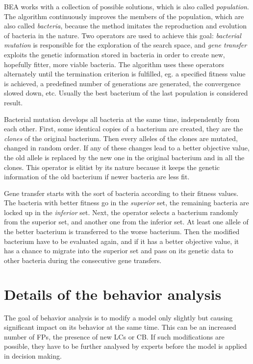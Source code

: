 \documentclass[graybox]{svmult}
\begin{document}
BEA works with a collection of possible solutions, which is also called 
\emph{population}. The algorithm continuously improves the members of 
the population, which are also called \emph{bacteria}, because the 
method imitates the reproduction and evolution of bacteria in the 
nature. Two operators are used to achieve this goal: \emph{bacterial 
mutation} is responsible for the exploration of the search space, and 
\emph{gene transfer} exploits the genetic information stored in 
bacteria in order to create new, hopefully fitter, more viable 
bacteria. The algorithm uses these operators alternately until the 
termination criterion is fulfilled, eg. a specified fitness value is 
achieved, a predefined number of generations are generated, the 
convergence slowed down, etc. Usually the best bacterium of the 
last population is considered result.

Bacterial mutation develops all bacteria at the same time, 
independently from each other. First, some identical copies of a 
bacterium are created, they are the \emph{clones} of the original 
bacterium. Then every alleles of the clones are mutated, changed in 
random order. If any of these changes lead to a better objective 
value, the old allele is replaced by the new one in the original 
bacterium and in all the clones. This operator is elitist by its 
nature because it keeps the genetic information of the old bacterium 
if newer bacteria are less fit.

Gene transfer starts with the sort of bacteria according to their 
fitness values. The bacteria with better fitness go in the 
\emph{superior} set, the remaining bacteria are locked up in the 
\emph{inferior} set. Next, the operator selects a bacterium randomly 
from the superior set, and another one from the inferior set. At least 
one allele of the better bacterium is transferred to the worse 
bacterium. Then the modified bacterium have to be evaluated again, and 
if it has a better objective value, it has a chance to migrate into 
the superior set and pass on its genetic data to other bacteria during 
the consecutive gene transfers.

\section{Details of the behavior analysis}
\label{sec:behaviorAnalysis}

The goal of behavior analysis is to modify a model only slightly but 
causing significant impact on its behavior at the same time. This 
can be an increased number of FPs, the presence of new LCs or CB. If 
such modifications are possible, they have to be further analysed by 
experts before the model is applied in decision making.
\end{document}
